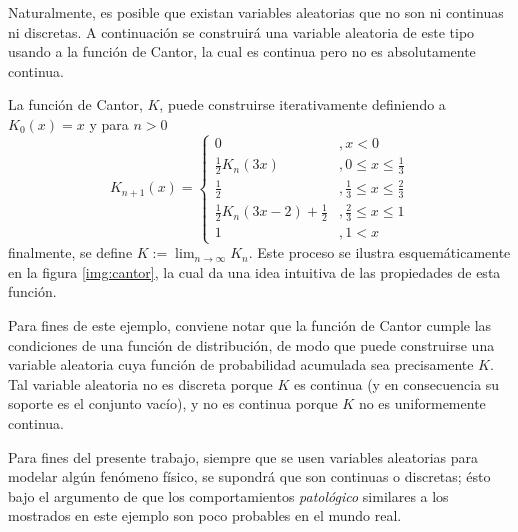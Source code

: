 \begin{ejemplo}
Naturalmente, es posible que existan variables aleatorias que no son ni continuas ni discretas.
%
A continuación se construirá una variable aleatoria de este tipo usando a la función de Cantor, la cual es continua pero no es absolutamente continua.

La función de Cantor, $K$, puede construirse iterativamente definiendo a $K_0(x) = x$ y para $n>0$
\begin{equation}
K_{n+1}(x) =
\begin{cases}
0 &, x < 0 \\
\frac{1}{2} K_n(3 x) &, 0\leq x \leq \frac{1}{3} \\
\frac{1}{2} &, \frac{1}{3} \leq x \leq \frac{2}{3} \\
\frac{1}{2} K_n(3 x-2) + \frac{1}{2} &, \frac{2}{3}\leq x \leq 1 \\
1 &, 1 < x
\end{cases}
\end{equation}
finalmente, se define $K := \lim_{n\rightarrow \infty} K_n$. Este proceso se ilustra esquemáticamente en la figura \ref{img:cantor}, la cual da una idea intuitiva de las propiedades de esta función.

Para fines de este ejemplo, conviene notar que la función de Cantor cumple las condiciones de una función de distribución, de modo que puede construirse una variable aleatoria cuya función de probabilidad acumulada sea precisamente $K$.
%
Tal variable aleatoria no es discreta porque $K$ es continua (y en consecuencia su soporte es el conjunto vacío), y no es continua porque $K$ no es uniformemente continua.

Para fines del presente trabajo, siempre que se usen variables aleatorias para modelar algún fenómeno físico, se supondrá que son continuas o discretas; ésto bajo el argumento de que los comportamientos \textit{patológico} similares a los mostrados en este ejemplo son poco probables en el mundo real.
\end{ejemplo}


